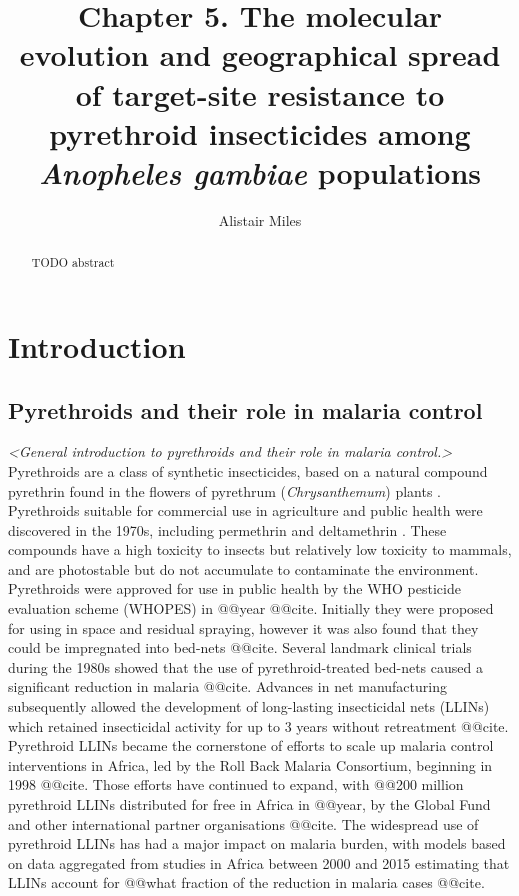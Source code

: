 \documentclass[a4paper,11pt,abstracton,hidelinks]{scrartcl}
\title{Chapter 5. The molecular evolution and geographical spread of target-site resistance to pyrethroid insecticides among \textit{Anopheles gambiae} populations}
\author[1,2]{\small Alistair Miles}
\affil[1]{\footnotesize Big Data Institute, University of Oxford, Li Ka Shing Centre for Health Information and Discovery, Old Road Campus, Oxford OX3 7LF}
\affil[2]{\footnotesize Wellcome Sanger Institute, Hinxton, Cambridge CB10 1SA}
\begin{document}
\maketitle


\begin{abstract}


TODO abstract


\end{abstract}


\section*{Introduction}


\subsection*{Pyrethroids and their role in malaria control}


\textit{<General introduction to pyrethroids and their role in malaria control.>}
%
Pyrethroids are a class of synthetic insecticides, based on a natural compound pyrethrin found in the flowers of pyrethrum (\textit{Chrysanthemum}) plants \autocite{Elliott1989}.
%
Pyrethroids suitable for commercial use in agriculture and public health were discovered in the 1970s, including permethrin \autocite{Elliott1973} and deltamethrin \autocite{Elliott1974}.
%
These compounds have a high toxicity to insects but relatively low toxicity to mammals, and are photostable but do not accumulate to contaminate the environment.
%
Pyrethroids were approved for use in public health by the WHO pesticide evaluation scheme (WHOPES) in @@year @@cite.
%
Initially they were proposed for using in space and residual spraying, however it was also found that they could be impregnated into bed-nets @@cite.
%
Several landmark clinical trials during the 1980s showed that the use of pyrethroid-treated bed-nets caused a significant reduction in malaria @@cite.
%
Advances in net manufacturing subsequently allowed the development of long-lasting insecticidal nets (LLINs) which retained insecticidal activity for up to 3 years without retreatment @@cite.
%
Pyrethroid LLINs became the cornerstone of efforts to scale up malaria control interventions in Africa, led by the Roll Back Malaria Consortium, beginning in 1998 @@cite.
%
Those efforts have continued to expand, with @@200 million pyrethroid LLINs distributed for free in Africa in @@year, by the Global Fund and other international partner organisations @@cite.
%
The widespread use of pyrethroid LLINs has had a major impact on malaria burden, with models based on data aggregated from studies in Africa between 2000 and 2015 estimating that LLINs account for @@what fraction of the reduction in malaria cases @@cite.
\end{document}
